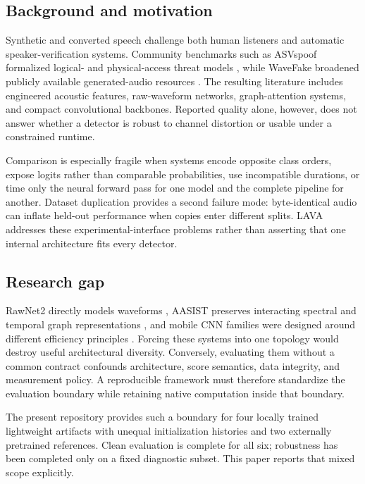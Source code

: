 \documentclass[10pt,journal]{IEEEtran}
\begin{document}
\subsection{Background and motivation}
Synthetic and converted speech challenge both human listeners and automatic speaker-verification systems. Community benchmarks such as ASVspoof formalized logical- and physical-access threat models \cite{wu2015asvspoof,kinnunen2017asvspoof,todisco2019asvspoof,yamagishi2021asvspoof,kinnunen2018tdcf}, while WaveFake broadened publicly available generated-audio resources \cite{frank2021wavefake}. The resulting literature includes engineered acoustic features, raw-waveform networks, graph-attention systems, and compact convolutional backbones. Reported quality alone, however, does not answer whether a detector is robust to channel distortion or usable under a constrained runtime.

Comparison is especially fragile when systems encode opposite class orders, expose logits rather than comparable probabilities, use incompatible durations, or time only the neural forward pass for one model and the complete pipeline for another. Dataset duplication provides a second failure mode: byte-identical audio can inflate held-out performance when copies enter different splits. LAVA addresses these experimental-interface problems rather than asserting that one internal architecture fits every detector.

\subsection{Research gap}
RawNet2 directly models waveforms \cite{tak2021rawnet2}, AASIST preserves interacting spectral and temporal graph representations \cite{jung2022aasist}, and mobile CNN families were designed around different efficiency principles \cite{howard2019mobilenetv3,sandler2018mobilenetv2,zhang2018shufflenet,ma2018shufflenetv2,tan2019efficientnet,tan2019mnasnet}. Forcing these systems into one topology would destroy useful architectural diversity. Conversely, evaluating them without a common contract confounds architecture, score semantics, data integrity, and measurement policy. A reproducible framework must therefore standardize the evaluation boundary while retaining native computation inside that boundary.

The present repository provides such a boundary for four locally trained lightweight artifacts with unequal initialization histories and two externally pretrained references. Clean evaluation is complete for all six; robustness has been completed only on a fixed diagnostic subset. This paper reports that mixed scope explicitly.
\end{document}
